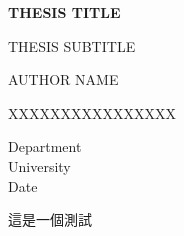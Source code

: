 \documentclass[12pt, a4paper]{article}
\begin{document}
\begin{CJK}{UTF8}{bsmi}

  \begin{titlepage}
    \begin{center}
      \vspace{1cm}
      
      \textbf{THESIS TITLE}
      \vspace {0.5cm}
      
      THESIS SUBTITLE
      \vspace{1.5cm}

      AUTHOR NAME
      \vfill

      XXXXXXXXXXXXXXXX
      \vspace{0.8cm}
      
      Department\\
      University\\
      Date\\
    \end{center}
   
  \end{titlepage}




  這是一個測試
  
\end{CJK}
\end{document}
